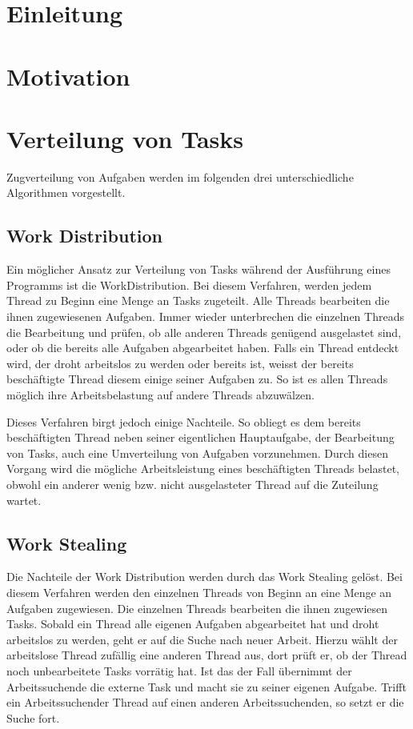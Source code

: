 \section{Einleitung}

\section{Motivation}

\section{Verteilung von Tasks}

Zugverteilung von Aufgaben werden im folgenden drei unterschiedliche Algorithmen vorgestellt.


\subsection{Work Distribution}

Ein möglicher Ansatz zur Verteilung von Tasks während der Ausführung eines Programms ist die WorkDistribution. Bei diesem Verfahren, werden jedem Thread zu Beginn eine Menge an Tasks zugeteilt. Alle Threads bearbeiten die ihnen zugewiesenen Aufgaben. Immer wieder unterbrechen die einzelnen Threads die Bearbeitung und prüfen, ob alle anderen Threads genügend ausgelastet sind, oder ob die bereits alle Aufgaben abgearbeitet haben. Falls ein Thread entdeckt wird, der droht arbeitslos zu werden oder bereits ist, weisst der bereits beschäftigte Thread diesem einige seiner Aufgaben zu. So ist es allen Threads möglich ihre Arbeitsbelastung auf andere Threads abzuwälzen. 

Dieses Verfahren birgt jedoch einige Nachteile. So obliegt es dem bereits beschäftigten Thread neben seiner eigentlichen Hauptaufgabe, der Bearbeitung von Tasks, auch eine Umverteilung von Aufgaben vorzunehmen. Durch diesen Vorgang wird die mögliche Arbeitsleistung eines beschäftigten Threads belastet, obwohl ein anderer wenig bzw. nicht ausgelasteter Thread auf die Zuteilung wartet.


\subsection{Work Stealing}

Die Nachteile der Work Distribution werden durch das Work Stealing gelöst. Bei diesem Verfahren werden den einzelnen Threads von Beginn an eine Menge an Aufgaben zugewiesen. Die einzelnen Threads bearbeiten die ihnen zugewiesen Tasks. Sobald ein Thread alle eigenen Aufgaben abgearbeitet hat und droht arbeitslos zu werden, geht er auf die Suche nach neuer Arbeit. Hierzu wählt der arbeitslose Thread zufällig eine anderen Thread aus, dort prüft er, ob der Thread noch unbearbeitete Tasks vorrätig hat. Ist das der Fall übernimmt der Arbeitssuchende die externe Task und macht sie zu seiner eigenen Aufgabe. Trifft ein Arbeitssuchender Thread auf einen anderen Arbeitssuchenden, so setzt er die Suche fort.


